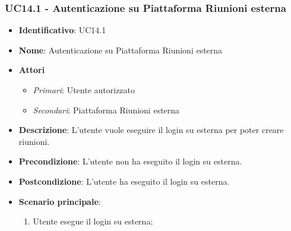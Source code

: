 \subsubsection{UC14.1 - Autenticazione su Piattaforma Riunioni esterna }
\begin{itemize}
	\item \textbf{Identificativo}: UC14.1
	\item \textbf{Nome}: Autenticazione su Piattaforma Riunioni esterna
	\item \textbf{Attori}
	\begin{itemize} 
		\item \textit{Primari}: Utente autorizzato
		\item \textit{Secondari}: Piattaforma Riunioni esterna
	\end{itemize}
	\item \textbf{Descrizione}: L'utente vuole eseguire il login su  esterna per poter creare riunioni.
	\item \textbf{Precondizione}: L'utente non ha eseguito il login su  esterna.
	\item \textbf{Postcondizione}: L'utente ha eseguito il login su  esterna.
	\item \textbf{Scenario principale}: \begin{enumerate}
		\item Utente esegue il login su  esterna; 
	\end{enumerate}
\end{itemize}

